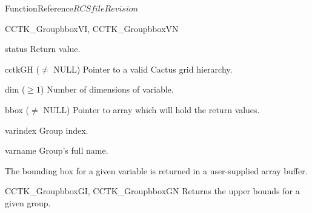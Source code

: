 \begin{cactuspart}{FunctionReference}{$RCSfile$}{$Revision$}
\begin{FunctionDescription}{CCTK\_GroupbboxVI, CCTK\_GroupbboxVN}
\begin{ParameterSection}
\begin{Parameter}{status} Return value. \end{Parameter}
\begin{Parameter}{cctkGH ($\ne$ NULL)} Pointer to a valid Cactus grid hierarchy. \end{Parameter}
\begin{Parameter}{dim ($\ge 1$)} Number of dimensions of variable. \end{Parameter}
\begin{Parameter}{bbox ($\ne$ NULL)} Pointer to array which will hold the return values. \end{Parameter}
\begin{Parameter}{varindex} Group index. \end{Parameter}
\begin{Parameter}{varname} Group's full name. \end{Parameter}
\end{ParameterSection}

\begin{Discussion}
The bounding box for a given variable is returned in a user-supplied array buffer.
\end{Discussion}

\begin{SeeAlsoSection}
\begin{SeeAlso}{CCTK\_GroupbboxGI, CCTK\_GroupbboxGN}
Returns the upper bounds for a given group.
\end{SeeAlso}
\end{SeeAlsoSection}

\end{FunctionDescription}



\end{cactuspart}
